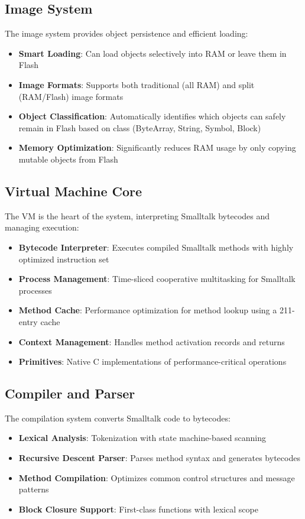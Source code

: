 \documentclass[12pt,a4paper]{report}
\begin{document}
\subsection{Image System}
The image system provides object persistence and efficient loading:

\begin{itemize}
    \item \textbf{Smart Loading}: Can load objects selectively into RAM or leave them in Flash
    \item \textbf{Image Formats}: Supports both traditional (all RAM) and split (RAM/Flash) image formats
    \item \textbf{Object Classification}: Automatically identifies which objects can safely remain in Flash based on class (ByteArray, String, Symbol, Block)
    \item \textbf{Memory Optimization}: Significantly reduces RAM usage by only copying mutable objects from Flash
\end{itemize}

\subsection{Virtual Machine Core}
The VM is the heart of the system, interpreting Smalltalk bytecodes and managing execution:

\begin{itemize}
    \item \textbf{Bytecode Interpreter}: Executes compiled Smalltalk methods with highly optimized instruction set
    \item \textbf{Process Management}: Time-sliced cooperative multitasking for Smalltalk processes
    \item \textbf{Method Cache}: Performance optimization for method lookup using a 211-entry cache
    \item \textbf{Context Management}: Handles method activation records and returns
    \item \textbf{Primitives}: Native C implementations of performance-critical operations
\end{itemize}

\subsection{Compiler and Parser}
The compilation system converts Smalltalk code to bytecodes:

\begin{itemize}
    \item \textbf{Lexical Analysis}: Tokenization with state machine-based scanning
    \item \textbf{Recursive Descent Parser}: Parses method syntax and generates bytecodes
    \item \textbf{Method Compilation}: Optimizes common control structures and message patterns
    \item \textbf{Block Closure Support}: First-class functions with lexical scope
\end{itemize}
\end{document}
